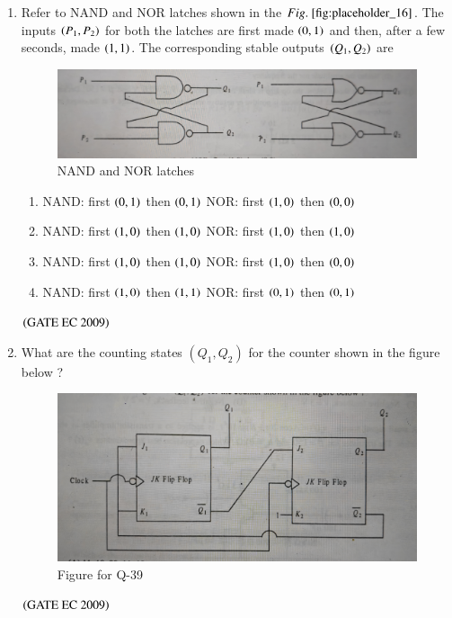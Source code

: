 \documentclass[journal,12pt,onecolumn]{IEEEtran}
\theoremstyle{remark}
\begin{document}
\begin{enumerate}[start=1, label={Q\arabic*.}]
\item Refer to NAND and NOR latches shown in the $\figref{fig:placeholder_16}$. The inputs $\left(P_1,P_2\right)$ for both the latches are first made $\left(0,1\right)$ and then, after a few seconds, made $\left(1,1\right)$. The corresponding stable outputs $\left(Q_1, Q_2\right)$ are
\begin{figure}[H]
    \centering
    \includegraphics[width=0.5\columnwidth]{figs/fig_16.jpg}
    \caption{\centering NAND and NOR latches}
    \label{fig:placeholder_16}
\end{figure}
\begin{enumerate}
    \item NAND: first $\left(0,1\right)$ then $\left(0,1\right)$   NOR: first $\left(1,0\right)$ then $\left(0,0\right)$
    \item NAND: first $\left(1,0\right)$ then $\left(1,0\right)$   NOR: first $\left(1,0\right)$ then $\left(1,0\right)$
    \item NAND: first $\left(1,0\right)$ then $\left(1,0\right)$   NOR: first $\left(1,0\right)$ then $\left(0,0\right)$
    \item NAND: first $\left(1,0\right)$ then $\left(1,1\right)$   NOR: first $\left(0,1\right)$ then $\left(0,1\right)$
\end{enumerate}
\hfill $\left(\text{GATE EC 2009}\right)$

\item What are the counting states $(Q_1, Q_2)$ for the counter shown in the figure below ?
\begin{figure}[H]
    \centering
    \includegraphics[width=0.5\columnwidth]{figs/fig_17.jpg}
    \caption{\centering Figure for Q-39}
    \label{fig:placeholder_17}
\end{figure}
\begin{enumerate}
\end{enumerate}
\hfill $\left(\text{GATE EC 2009}\right)$


\end{enumerate}
\end{document}
